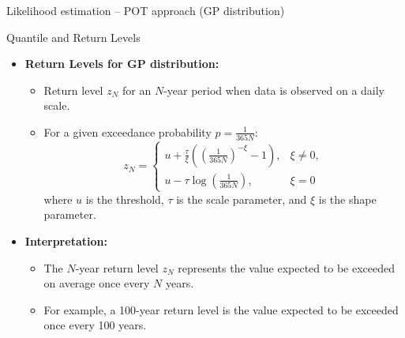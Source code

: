 \documentclass[10pt, hyperref={colorlinks = true,linkcolor = blue}]{beamer}
\begin{document}
{{{\begin{frame}{Likelihood estimation -- POT approach (GP distribution)}
\end{frame}



\begin{frame}{Quantile and Return Levels}

\begin{itemize}
    \item \textbf{Return Levels for GP distribution:}
    \begin{itemize}
        \item Return level \( z_N \) for an \(N\)-year period when data is observed on a daily scale.
        \item For a given exceedance probability \( p = \frac{1}{365N} \):
        \[
        z_N = 
        \begin{cases}
            u + \frac{\tau}{\xi} \left( \left( \frac{1}{365N} \right)^{-\xi} - 1 \right), & \xi \neq 0, \\
            u - \tau \log \left( \frac{1}{365N} \right), & \xi = 0
        \end{cases}
        \]
        where \( u \) is the threshold, \( \tau \) is the scale parameter, and \( \xi \) is the shape parameter.
    \end{itemize}
    \item \textbf{Interpretation:}
    \begin{itemize}
        \item The \(N\)-year return level \( z_N \) represents the value expected to be exceeded on average once every \(N\) years.
        \item For example, a 100-year return level is the value expected to be exceeded once every 100 years.
    \end{itemize}
\end{itemize}

\end{frame}
}
}

}
\end{document}
